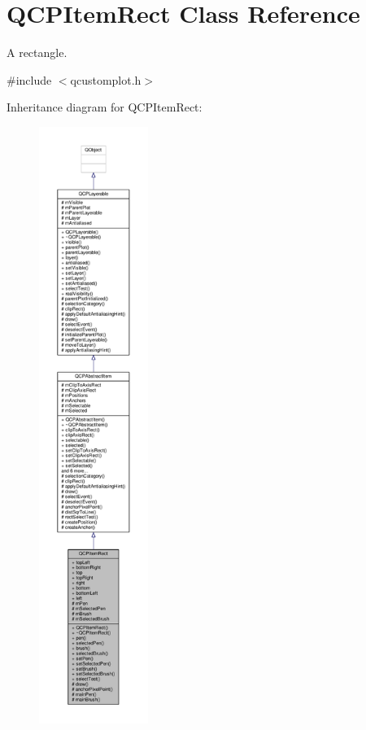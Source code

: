 \hypertarget{class_q_c_p_item_rect}{}\section{Q\+C\+P\+Item\+Rect Class Reference}
\label{class_q_c_p_item_rect}


A rectangle.  




{\ttfamily \#include $<$qcustomplot.\+h$>$}



Inheritance diagram for Q\+C\+P\+Item\+Rect\+:\nopagebreak
\begin{figure}[H]
\begin{center}
\leavevmode
\includegraphics[height=550pt]{class_q_c_p_item_rect__inherit__graph}
\end{center}
\end{figure}


